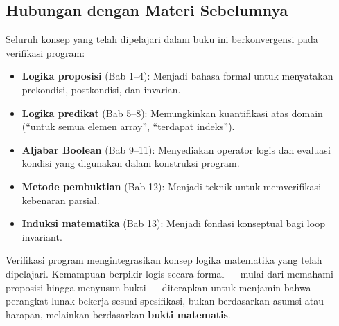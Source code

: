\subsection{Hubungan dengan Materi Sebelumnya}

Seluruh konsep yang telah dipelajari dalam buku ini berkonvergensi pada verifikasi program:

\begin{itemize}
    \item \textbf{Logika proposisi} (Bab 1--4): Menjadi bahasa formal untuk menyatakan prekondisi, postkondisi, dan invarian.
    \item \textbf{Logika predikat} (Bab 5--8): Memungkinkan kuantifikasi atas domain (``untuk semua elemen array'', ``terdapat indeks'').
    \item \textbf{Aljabar Boolean} (Bab 9--11): Menyediakan operator logis dan evaluasi kondisi yang digunakan dalam konstruksi program.
    \item \textbf{Metode pembuktian} (Bab 12): Menjadi teknik untuk memverifikasi kebenaran parsial.
    \item \textbf{Induksi matematika} (Bab 13): Menjadi fondasi konseptual bagi loop invariant.
\end{itemize}

\begin{konsep}
Verifikasi program mengintegrasikan konsep logika matematika yang telah dipelajari. Kemampuan berpikir logis secara formal --- mulai dari memahami proposisi hingga menyusun bukti --- diterapkan untuk menjamin bahwa perangkat lunak bekerja sesuai spesifikasi, bukan berdasarkan asumsi atau harapan, melainkan berdasarkan \textbf{bukti matematis}.
\end{konsep}
